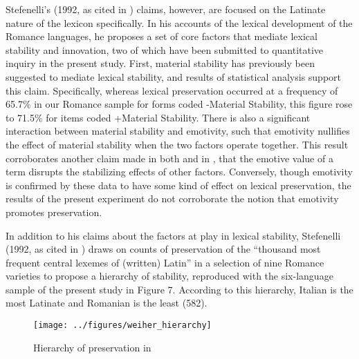 \documentclass[output=paper,colorlinks,citecolor=brown,
]{langscibook}
\begin{document}
Stefenelli’s (1992, as cited in \citealt{stefenelli_lexical_2011}) claims, however, are focused on the Latinate nature of the lexicon specifically. In his accounts of the lexical development of the Romance languages, he proposes a set of core factors that mediate lexical stability and innovation, two of which have been submitted to quantitative inquiry in the present study. First, material stability has previously been suggested to mediate lexical stability, and results of statistical analysis support this claim. Specifically, whereas lexical preservation occurred at a frequency of 65.7\% in our Romance sample for forms coded -Material Stability, this figure rose to 71.5\% for items coded +Material Stability. There is also a significant interaction between material stability and emotivity, such that emotivity nullifies the effect of material stability when the two factors operate together. This result corroborates another claim made in both \citealt[325]{posner_romance_1996} and in \citealt[580]{stefenelli_lexical_2011}, that the emotive value of a term disrupts the stabilizing effects of other factors. Conversely, though emotivity is confirmed by these data to have some kind of effect on lexical preservation, the results of the present experiment do not corroborate the notion that emotivity promotes preservation.

In addition to his claims about the factors at play in lexical stability, Stefenelli (1992, as cited in \citealt[569]{stefenelli_lexical_2011}) draws on counts of preservation of the “thousand most frequent central lexemes of (written) Latin” in a selection of nine Romance varieties to propose a hierarchy of stability, reproduced with the six-language sample of the present study in Figure 7. According to this hierarchy, Italian is the most Latinate and Romanian is the least (582).

\begin{figure}
    
    \texttt{[image: ../figures/weiher\_hierarchy]}
    \caption{Hierarchy of preservation in \citet{stefenelli_lexical_2011}} 
    \label{fig:weiher:galaxy}
\end{figure}
\end{document}
